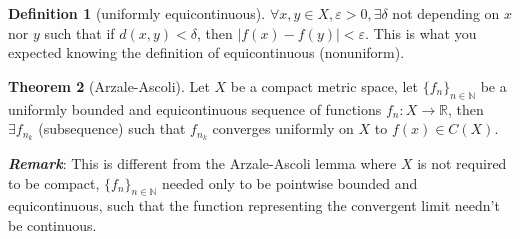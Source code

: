 \documentclass[13pt]{article}
\theoremstyle{definition} --- default
\newtheorem{theorem}{Theorem}
\theoremstyle{definition}
\newtheorem{definition}[theorem]{Definition}
\theoremstyle{remark}
\begin{document}
\begin{definition}[uniformly equicontinuous]
	$\forall x,y \in X, \varepsilon > 0, \exists \delta$ not depending on $x$ nor $y$ such that if $d(x,y) < \delta$, then $|f(x) - f(y)| < \varepsilon$. This is what you expected knowing the definition of equicontinuous (nonuniform).
\end{definition}

\begin{theorem}[Arzale-Ascoli]
	Let $X$ be a compact metric space, let $\{f_n\}_{n \in \mathbb{N}}$ be a uniformly bounded and equicontinuous sequence of functions $f_n \colon X \to \mathbb{R}$, then $\exists f_{n_k}$ (subsequence) such that $f_{n_k}$ converges uniformly on $X$ to $f(x) \in C(X)$. 

\end{theorem}

\textit{\textbf{Remark}}:
This is different from the Arzale-Ascoli lemma where $X$ is not required to be compact, $\{f_n\}_{n \in \mathbb{N}}$ needed only to be pointwise bounded and equicontinuous, such that the function representing the convergent limit needn't be continuous. 
\end{document}
